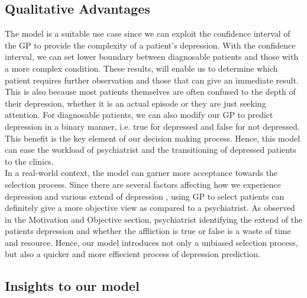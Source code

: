 \documentclass{article}
\begin{document}
	\subsection{Qualitative Advantages}
	The model is a suitable use case since we can exploit the confidence interval of the GP to provide the complexity of a patient's depression.
	With the confidence interval, we can set lower boundary between diagnosable patients and those with a more complex condition.
	These results, will enable us to determine which patient requires further observation and those that can give an immediate result.
	This is also because most patients themselves are often confused to the depth of their depression, whether it is an actual episode or they are just seeking attention.
	For diagnosable patients, we can also modify our GP to predict depression in a binary manner, i.e. true for depressed and false for not depressed.
	This benefit is the key element of our decision making process.
	Hence, this model can ease the workload of psychiatrist and the transitioning of depressed patients to the clinics. \\

	In a real-world context, the model can garner more acceptance towards the selection process.
	Since there are several factors affecting how we experience depression and various extend of depression \cite{nimh2015}, using GP to select patients can definitely give a more objective view as compared to a psychiatrist.
	As observed in the Motivation and Objective section, psychiatrist identifying the extend of the patients depression and whether the affliction is true or false is a waste of time and resource.
	Hence, our model introduces not only a unbiased selection process, but also a quicker and more effiecient process of depression prediction.

	\subsection{Insights to our model}
\end{document}
